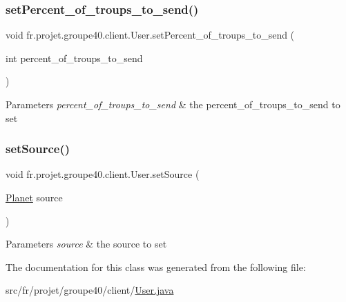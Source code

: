 \mbox{\label{classfr_1_1projet_1_1groupe40_1_1client_1_1_user_a2eef817de379ad3bf873c7960df2f2cc}} 
\subsubsection{\texorpdfstring{set\+Percent\+\_\+of\+\_\+troups\+\_\+to\+\_\+send()}{setPercent\_of\_troups\_to\_send()}}
{\footnotesize\ttfamily void fr.\+projet.\+groupe40.\+client.\+User.\+set\+Percent\+\_\+of\+\_\+troups\+\_\+to\+\_\+send (\begin{DoxyParamCaption}\item[{int}]{percent\+\_\+of\+\_\+troups\+\_\+to\+\_\+send }\end{DoxyParamCaption})}


\begin{DoxyParams}{Parameters}
{\em percent\+\_\+of\+\_\+troups\+\_\+to\+\_\+send} & the percent\+\_\+of\+\_\+troups\+\_\+to\+\_\+send to set \\
\hline
\end{DoxyParams}
\mbox{\label{classfr_1_1projet_1_1groupe40_1_1client_1_1_user_a0ce1d1c1323e06ac29b2f8a129d90762}} 
\subsubsection{\texorpdfstring{set\+Source()}{setSource()}}
{\footnotesize\ttfamily void fr.\+projet.\+groupe40.\+client.\+User.\+set\+Source (\begin{DoxyParamCaption}\item[{\hyperlink{classfr_1_1projet_1_1groupe40_1_1model_1_1board_1_1_planet}{Planet}}]{source }\end{DoxyParamCaption})}


\begin{DoxyParams}{Parameters}
{\em source} & the source to set \\
\hline
\end{DoxyParams}


The documentation for this class was generated from the following file\+:\begin{DoxyCompactItemize}
\item 
src/fr/projet/groupe40/client/\hyperlink{_user_8java}{User.\+java}\end{DoxyCompactItemize}
